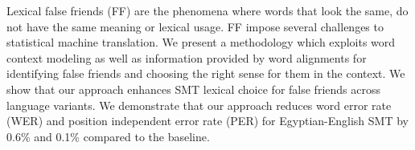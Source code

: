 Lexical false friends (FF) are the phenomena where words that look the same, do not have the same meaning or lexical usage. FF impose several challenges to statistical machine translation. We present a methodology which exploits word context modeling as well as information provided by word alignments for identifying false friends and choosing the right sense for them in the context. We show that our approach enhances SMT lexical choice for false friends across language variants. We demonstrate that our approach reduces word error rate (WER) and position independent error rate (PER) for Egyptian-English SMT by 0.6\% and 0.1\% compared to the baseline.
